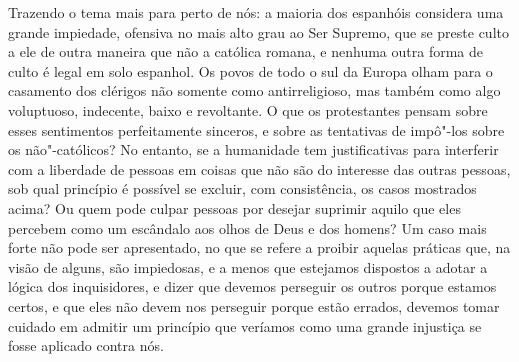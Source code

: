  Trazendo o tema mais para perto de nós: a maioria dos espanhóis
considera uma grande impiedade, ofensiva no mais alto grau ao Ser
Supremo, que se preste culto a ele de outra maneira que não a católica
romana, e nenhuma outra forma de culto é legal em solo espanhol. Os
povos de todo o sul da Europa olham para o casamento dos clérigos não
somente como antirreligioso, mas também como algo voluptuoso,
indecente, baixo e revoltante. O que os protestantes pensam sobre esses
sentimentos perfeitamente sinceros, e sobre as tentativas de impô"-los
sobre os não"-católicos? No entanto, se a humanidade tem
justificativas para interferir com a liberdade de pessoas em coisas que
não são do interesse das outras pessoas, sob qual princípio é possível se
excluir, com consistência, os casos mostrados acima? Ou quem pode
culpar pessoas por desejar suprimir aquilo que eles percebem como
um escândalo aos olhos de Deus e dos homens? Um caso mais forte não
pode ser apresentado, no que se refere a proibir aquelas práticas que,
na visão de alguns, são impiedosas, e a menos que estejamos dispostos a
adotar a lógica dos inquisidores, e dizer que devemos perseguir os
outros porque estamos certos, e que eles não devem nos perseguir porque
estão errados, devemos tomar cuidado em admitir um princípio que
veríamos como uma grande injustiça se fosse aplicado contra nós.


